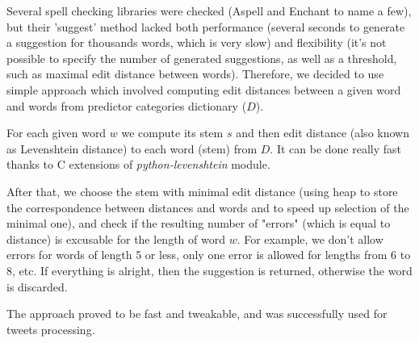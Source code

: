 Several spell checking libraries were checked (Aspell and Enchant to name a few), but their 'suggest' method lacked both performance (several seconds to generate a suggestion for thousands words, which is very slow) and flexibility (it's not possible to specify the number of generated suggestions, as well as a threshold, such as maximal edit distance between words). Therefore, we decided to use simple approach which involved computing edit distances between a given word and words from predictor categories dictionary ($D$).

For each given word $w$ we compute its stem $s$ and then edit distance (also known as Levenshtein distance) to each word (stem) from $D$. It can be done really fast thanks to C extensions of \textit{python-levenshtein} module.

After that, we choose the stem with minimal edit distance (using heap to store the correspondence between distances and words and to speed up selection of the minimal one), and check if the resulting number of "errors" (which is equal to distance) is excusable for the length of word $w$. For example, we don't allow errors for words of length 5 or less, only one error is allowed for lengths from 6 to 8, etc. If everything is alright, then the suggestion is returned, otherwise the word is discarded.

The approach proved to be fast and tweakable, and was successfully used for tweets processing.
